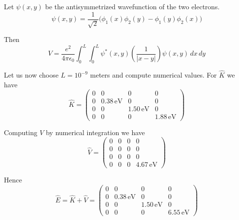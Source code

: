\documentclass[12pt]{article}
\begin{document}
\noindent
Let $\psi(x,y)$ be the antisymmetrized wavefunction of the two electrons.
\begin{equation*}
\psi(x,y)=\frac{1}{\sqrt{2}}\big(\phi_1(x)\phi_2(y)-\phi_1(y)\phi_2(x)\big)
\end{equation*}

\noindent
Then
\begin{equation*}
V=\frac{e^2}{4\pi\epsilon_0}\int_0^L\int_0^L
\psi^*(x,y)\left(\frac{1}{|x-y|}\right)\psi(x,y)\,dx\,dy
\end{equation*}

\noindent
Let us now choose $L=10^{-9}$ meters and compute numerical values.
For $\hat{K}$ we have
\begin{equation*}
\hat{K}=\begin{pmatrix}
0 & 0 & 0 & 0\\
0 & 0.38\,\text{eV} & 0 & 0\\
0 & 0 & 1.50\,\text{eV} & 0\\
0 & 0 & 0 & 1.88\,\text{eV}
\end{pmatrix}
\end{equation*}

\noindent
Computing $V$ by numerical integration we have
\begin{equation*}
\hat{V}=\begin{pmatrix}
0 & 0 & 0 & 0\\
0 & 0 & 0 & 0\\
0 & 0 & 0 & 0\\
0 & 0 & 0 & 4.67\,\text{eV}
\end{pmatrix}
\end{equation*}

\noindent
Hence
\begin{equation*}
\hat{E}=\hat{K}+\hat{V}=\begin{pmatrix}
0 & 0 & 0 & 0\\
0 & 0.38\,\text{eV} & 0 & 0\\
0 & 0 & 1.50\,\text{eV} & 0\\
0 & 0 & 0 & 6.55\,\text{eV}
\end{pmatrix}
\end{equation*}
\end{document}
